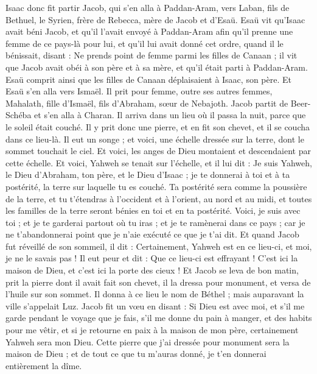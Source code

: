 \begin{multicols}{2}
Isaac donc fit partir Jacob, qui s'en alla à Paddan-Aram, vers Laban, fils de Bethuel, le Syrien, frère de Rebecca, mère de Jacob et d'Esaü.
Esaü vit qu'Isaac avait béni Jacob, et qu'il l'avait envoyé à Paddan-Aram afin qu'il prenne une femme de ce pays-là pour lui, et qu'il lui avait donné cet ordre, quand il le bénissait, disant : Ne prends point de femme parmi les filles de Canaan ;
il vit que Jacob avait obéi à son père et à sa mère, et qu'il était parti à Paddan-Aram.
Esaü comprit ainsi que les filles de Canaan déplaisaient à Isaac, son père.
Et Esaü s'en alla vers Ismaël. Il prit pour femme, outre ses autres femmes, Mahalath, fille d'Ismaël, fils d'Abraham, sœur de Nebajoth.
Jacob partit de Beer-Schéba et s'en alla à Charan.
Il arriva dans un lieu où il passa la nuit, parce que le soleil était couché. Il y prit donc une pierre, et en fit son chevet, et il se coucha dans ce lieu-là.
Il eut un songe ; et voici, une échelle dressée sur la terre, dont le sommet touchait le ciel. Et voici, les anges de Dieu montaient et descendaient par cette échelle.
Et voici, Yahweh se tenait sur l'échelle, et il lui dit : Je suis Yahweh, le Dieu d'Abraham, ton père, et le Dieu d'Isaac ; je te donnerai à toi et à ta postérité, la terre sur laquelle tu es couché.
Ta postérité sera comme la poussière de la terre, et tu t'étendras à l'occident et à l'orient, au nord et au midi, et toutes les familles de la terre seront bénies en toi et en ta postérité.
Voici, je suis avec toi ; et je te garderai partout où tu iras ; et je te ramènerai dans ce pays ; car je ne t'abandonnerai point que je n'aie exécuté ce que je t'ai dit.
Et quand Jacob fut réveillé de son sommeil, il dit : Certainement, Yahweh est en ce lieu-ci, et moi, je ne le savais pas !
Il eut peur et dit : Que ce lieu-ci est effrayant ! C'est ici la maison de Dieu, et c'est ici la porte des cieux !
Et Jacob se leva de bon matin, prit la pierre dont il avait fait son chevet, il la dressa pour monument, et versa de l'huile sur son sommet.
Il donna à ce lieu le nom de Béthel ; mais auparavant la ville s'appelait Luz.
Jacob fit un vœu en disant : Si Dieu est avec moi, et s'il me garde pendant le voyage que je fais, s'il me donne du pain à manger, et des habits pour me vêtir,
et si je retourne en paix à la maison de mon père, certainement Yahweh sera mon Dieu.
Cette pierre que j'ai dressée pour monument sera la maison de Dieu ; et de tout ce que tu m'auras donné, je t'en donnerai entièrement la dîme.

\end{multicols}
